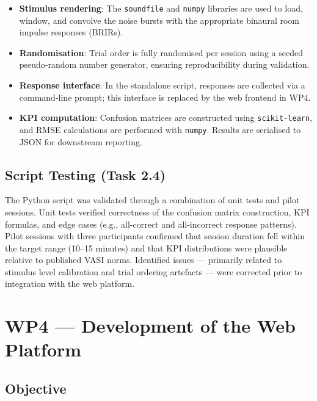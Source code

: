 \begin{itemize}
    \item \textbf{Stimulus rendering}: The \texttt{soundfile} and \texttt{numpy} libraries
    are used to load, window, and convolve the noise bursts with the appropriate binaural
    room impulse responses (BRIRs).
    \item \textbf{Randomisation}: Trial order is fully randomised per session using a
    seeded pseudo-random number generator, ensuring reproducibility during validation.
    \item \textbf{Response interface}: In the standalone script, responses are collected
    via a command-line prompt; this interface is replaced by the web frontend in WP4.
    \item \textbf{KPI computation}: Confusion matrices are constructed using
    \texttt{scikit-learn}, and RMSE calculations are performed with \texttt{numpy}.
    Results are serialised to JSON for downstream reporting.
\end{itemize}

\subsection{Script Testing (Task 2.4)}

The Python script was validated through a combination of unit tests and pilot sessions.
Unit tests verified correctness of the confusion matrix construction, KPI formulas, and
edge cases (e.g., all-correct and all-incorrect response patterns). Pilot sessions with
three participants confirmed that session duration fell within the target range
(10–15 minutes) and that KPI distributions were plausible relative to published VASI
norms. Identified issues — primarily related to stimulus level calibration and trial
ordering artefacts — were corrected prior to integration with the web platform.

\section{WP4 — Development of the Web Platform}
\label{sec:wp4}

\subsection{Objective}

